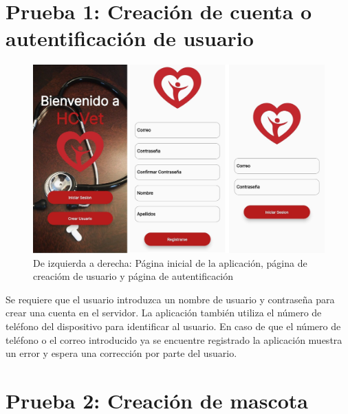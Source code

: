 \newpage
\section{Prueba 1: Creación de cuenta o autentificación de usuario}

\begin{figure}[h!]
\begin{center}
\includegraphics[scale=0.25]{Graphics/images/hcvet/init.jpg}
\caption{De izquierda a derecha: Página inicial de la aplicación, página de creacióm de usuario y página de autentificación}
\label{fig:bac}

\end{center}
\end{figure}

Se requiere que el usuario introduzca un nombre de usuario y contraseña para crear una cuenta en el servidor. La aplicación también utiliza el número de teléfono del dispositivo para identificar al usuario. En caso de que el número de teléfono o el correo introducido ya se encuentre registrado la aplicación muestra un error y espera una corrección por parte del usuario.

\newpage
 
\section{Prueba 2: Creación de mascota}

